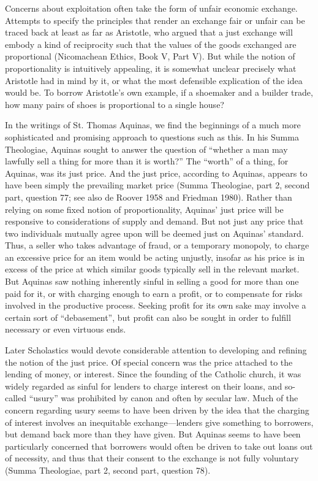 \begin{displayquote}
 Concerns about exploitation often take the form of unfair economic exchange. Attempts to specify the principles that render an exchange fair or unfair can be traced back at least as far as Aristotle, who argued that a just exchange will embody a kind of reciprocity such that the values of the goods exchanged are proportional (Nicomachean Ethics, Book V, Part V). But while the notion of proportionality is intuitively appealing, it is somewhat unclear precisely what Aristotle had in mind by it, or what the most defensible explication of the idea would be. To borrow Aristotle’s own example, if a shoemaker and a builder trade, how many pairs of shoes is proportional to a single house?

In the writings of St. Thomas Aquinas, we find the beginnings of a much more sophisticated and promising approach to questions such as this. In his Summa Theologiae, Aquinas sought to answer the question of “whether a man may lawfully sell a thing for more than it is worth?” The “worth” of a thing, for Aquinas, was its just price. And the just price, according to Aquinas, appears to have been simply the prevailing market price (Summa Theologiae, part 2, second part, question 77; see also de Roover 1958 and Friedman 1980). Rather than relying on some fixed notion of proportionality, Aquinas’ just price will be responsive to considerations of supply and demand. But not just any price that two individuals mutually agree upon will be deemed just on Aquinas’ standard. Thus, a seller who takes advantage of fraud, or a temporary monopoly, to charge an excessive price for an item would be acting unjustly, insofar as his price is in excess of the price at which similar goods typically sell in the relevant market. But Aquinas saw nothing inherently sinful in selling a good for more than one paid for it, or with charging enough to earn a profit, or to compensate for risks involved in the productive process. Seeking profit for its own sake may involve a certain sort of “debasement”, but profit can also be sought in order to fulfill necessary or even virtuous ends.

Later Scholastics would devote considerable attention to developing and refining the notion of the just price. Of special concern was the price attached to the lending of money, or interest. Since the founding of the Catholic church, it was widely regarded as sinful for lenders to charge interest on their loans, and so-called “usury” was prohibited by canon and often by secular law. Much of the concern regarding usury seems to have been driven by the idea that the charging of interest involves an inequitable exchange—lenders give something to borrowers, but demand back more than they have given. But Aquinas seems to have been particularly concerned that borrowers would often be driven to take out loans out of necessity, and thus that their consent to the exchange is not fully voluntary (Summa Theologiae, part 2, second part, question 78).


\end{displayquote}
